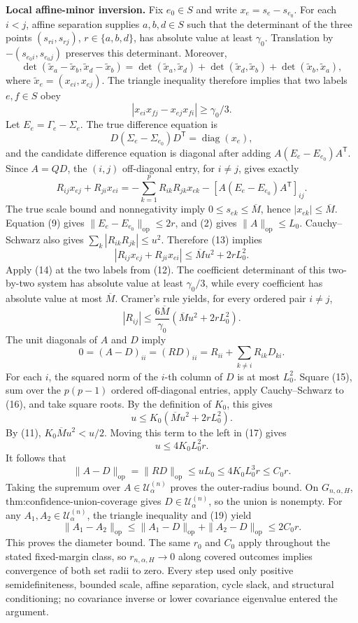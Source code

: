 \textbf{Local affine-minor inversion.}
Fix \(e_0\in S\) and write \(x_e=s_e-s_{e_0}\). For each \(i<j\), affine separation supplies \(a,b,d\in S\) such that the determinant of the three points \((s_{ri},s_{rj})\), \(r\in\{a,b,d\}\), has absolute value at least \(\gamma_0\). Translation by \(-(s_{e_0i},s_{e_0j})\) preserves this determinant. Moreover,
\[
\det(\widetilde x_a-\widetilde x_b,
\widetilde x_d-\widetilde x_b)
=\det(\widetilde x_a,\widetilde x_d)
+\det(\widetilde x_d,\widetilde x_b)
+\det(\widetilde x_b,\widetilde x_a),
\]
where \(\widetilde x_e=(x_{ei},x_{ej})\). The triangle inequality therefore implies that two labels \(e,f\in S\) obey
\[
|x_{ei}x_{fj}-x_{ej}x_{fi}|\geq\gamma_0/3.
\tag{12}
\]
Let \(E_e=\Gamma_e-\Sigma_e\). The true difference equation is
\[
D(\Sigma_e-\Sigma_{e_0})D^{\mathsf T}=\operatorname{diag}(x_e),
\]
and the candidate difference equation is diagonal after adding \(A(E_e-E_{e_0})A^{\mathsf T}\). Since \(A=QD\), the \((i,j)\) off-diagonal entry, for \(i\neq j\), gives exactly
\[
R_{ij}x_{ej}+R_{ji}x_{ei}
=-\sum_{k=1}^pR_{ik}R_{jk}x_{ek}
-[A(E_e-E_{e_0})A^{\mathsf T}]_{ij}.
\tag{13}
\]
The true scale bound and nonnegativity imply \(0\leq s_{ek}\leq\overline M\), hence \(|x_{ek}|\leq\overline M\). Equation (9) gives \(\|E_e-E_{e_0}\|_{\mathrm{op}}\leq2r\), and (2) gives \(\|A\|_{\mathrm{op}}\leq L_0\). Cauchy--Schwarz also gives \(\sum_k|R_{ik}R_{jk}|\leq u^2\). Therefore (13) implies
\[
|R_{ij}x_{ej}+R_{ji}x_{ei}|
\leq\overline M u^2+2rL_0^2.
\tag{14}
\]
Apply (14) at the two labels from (12). The coefficient determinant of this two-by-two system has absolute value at least \(\gamma_0/3\), while every coefficient has absolute value at most \(\overline M\). Cramer's rule yields, for every ordered pair \(i\neq j\),
\[
|R_{ij}|
\leq\frac{6\overline M}{\gamma_0}
\left(\overline M u^2+2rL_0^2\right).
\tag{15}
\]
The unit diagonals of \(A\) and \(D\) imply
\[
0=(A-D)_{ii}=(RD)_{ii}
=R_{ii}+\sum_{k\neq i}R_{ik}D_{ki}.
\tag{16}
\]
For each \(i\), the squared norm of the \(i\)-th column of \(D\) is at most \(L_0^2\). Square (15), sum over the \(p(p-1)\) ordered off-diagonal entries, apply Cauchy--Schwarz to (16), and take square roots. By the definition of \(K_0\), this gives
\[
u\leq K_0\left(\overline M u^2+2rL_0^2\right).
\tag{17}
\]
By (11), \(K_0\overline M u^2<u/2\). Moving this term to the left in (17) gives
\[
u\leq4K_0L_0^2r.
\tag{18}
\]
It follows that
\[
\|A-D\|_{\mathrm{op}}
=\|RD\|_{\mathrm{op}}
\leq uL_0
\leq4K_0L_0^3r
\leq C_0r.
\tag{19}
\]
Taking the supremum over \(A\in\mathcal U^{(n)}_\alpha\) proves the outer-radius bound. On \(G_{n,\alpha,H}\), \(\text{thm:confidence-union-coverage}\) gives \(D\in\mathcal U^{(n)}_\alpha\), so the union is nonempty. For any \(A_1,A_2\in\mathcal U^{(n)}_\alpha\), the triangle inequality and (19) yield
\[
\|A_1-A_2\|_{\mathrm{op}}
\leq\|A_1-D\|_{\mathrm{op}}+\|A_2-D\|_{\mathrm{op}}
\leq2C_0r.
\]
This proves the diameter bound. The same \(r_0\) and \(C_0\) apply throughout the stated fixed-margin class, so \(r_{n,\alpha,H}\to0\) along covered outcomes implies convergence of both set radii to zero. Every step used only positive semidefiniteness, bounded scale, affine separation, cycle slack, and structural conditioning; no covariance inverse or lower covariance eigenvalue entered the argument.